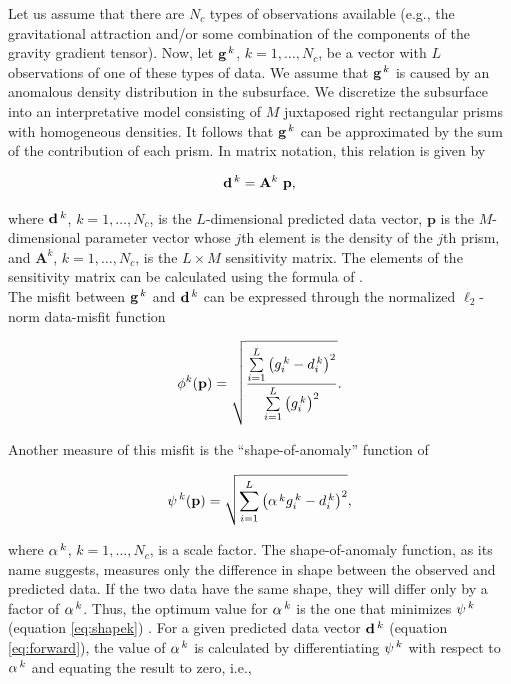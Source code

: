 \documentclass{segabs}
\newcommand{\vect}[1]{\mathbf{#1}}
\newcommand{\mat}[1]{\mathbf{#1}}
\begin{document}
\begin{sloppypar}
Let us assume that there are $N_{c}$ types of observations available (e.g.,
the gravitational attraction and/or some combination of the components of the
gravity gradient tensor).
Now, let $\vect{g}^{\thinspace k}$, $k=1,\ldots,N_{c}$, be a vector with
$L$ observations of one of these types of data.
We assume that $\vect{g}^{\thinspace k}$ is caused by an anomalous density
distribution in the subsurface.
We discretize the subsurface into an interpretative model consisting of $M$
juxtaposed right rectangular prisms with homogeneous densities.
It follows that $\vect{g}^{\thinspace k}$ can be approximated by the sum of the
contribution of each prism.
In matrix notation, this relation is given by

\begin{equation}
    \vect{d}^{\thinspace k} = \mat{A}^{k}~\vect{p},
    \label{eq:forward}
\end{equation}

where $\vect{d}^{\thinspace k}$, $k=1,\ldots,N_{c}$, is the $L$-dimensional
predicted data vector,
$\vect{p}$ is the $M$-dimensional parameter vector whose $j$th element is the
density of the $j$th prism, and $\mat{A}^{k}$, $k=1,\ldots,N_{c}$, is the
$L \times M$ sensitivity matrix.
The elements of the sensitivity matrix can be calculated using the formula of
\citet{Nagy2000}.
\\[0.2cm]
The misfit between $\vect{g}^{\thinspace k}$ and $\vect{d}^{\thinspace k}$ can
be expressed through the normalized $\ell_{2}$-norm data-misfit function

\begin{equation}
    \phi^{k}(\vect{p}) = \sqrt{
    \dfrac{
        \sum\limits_{i=1}^{L}
        \left( g_{i}^{\thinspace k} - d_{i}^{\thinspace k} \right)^{2}
    }{
        \sum\limits_{i=1}^{L}\left(g_{i}^{\thinspace k}\right)^{2}}}.
    \label{eq:phik}
\end{equation}

Another measure of this misfit is the ``shape-of-anomaly'' function of
\citet{Rene1986}

\begin{equation}
    \psi^{\thinspace k}(\vect{p}) = \sqrt{
        \sum\limits_{i=1}^{L}
        \left(\alpha^{\thinspace k} g_{i}^{\thinspace k} - d_{i}^{\thinspace k}
        \right)^{2}
    }, 
    \label{eq:shapek}
\end{equation}

where $\alpha^{\thinspace k}$, $k=1,\ldots,N_{c}$, is a scale factor.
The shape-of-anomaly function, as its name suggests, measures only the
difference in shape between the observed and predicted data.
If the two data have the same shape, they will differ only by a factor of
$\alpha^{\thinspace k}$.
Thus, the optimum value for $\alpha^{\thinspace k}$ is the one that minimizes
$\psi^{\thinspace k}$ (equation \ref{eq:shapek}) \citep{Rene1986}.
For a given predicted data vector $\vect{d}^{\thinspace k}$
(equation \ref{eq:forward}), the value of
$\alpha^{\thinspace k}$ is calculated by differentiating $\psi^{\thinspace k}$
with respect to $\alpha^{\thinspace k}$ and equating the result to zero,
i.e.,


\end{sloppypar}
\end{document}
